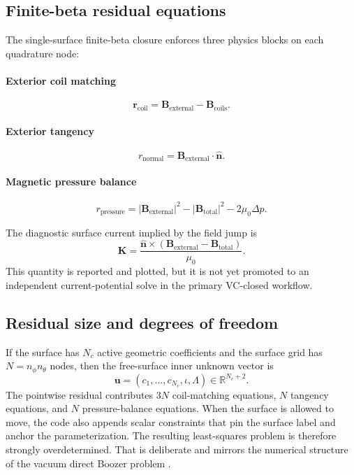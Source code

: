 \documentclass[11pt]{article}
\begin{document}
\subsection{Finite-beta residual equations}
The single-surface finite-beta closure enforces three physics blocks on each quadrature node:

\paragraph{Exterior coil matching}
\begin{equation}
  \mathbf{r}_{\mathrm{coil}} = \mathbf{B}_{\mathrm{external}} - \mathbf{B}_{\mathrm{coils}}.
  \label{eq:rcoil}
\end{equation}

\paragraph{Exterior tangency}
\begin{equation}
  r_{\mathrm{normal}} = \mathbf{B}_{\mathrm{external}} \cdot \hat{\mathbf{n}}.
  \label{eq:rnormal}
\end{equation}

\paragraph{Magnetic pressure balance}
\begin{equation}
  r_{\mathrm{pressure}} = |\mathbf{B}_{\mathrm{external}}|^2 - |\mathbf{B}_{\mathrm{total}}|^2 - 2\mu_0 \Delta p.
  \label{eq:rpressure}
\end{equation}

The diagnostic surface current implied by the field jump is
\begin{equation}
  \mathbf{K} = \frac{\hat{\mathbf{n}} \times \left(\mathbf{B}_{\mathrm{external}} - \mathbf{B}_{\mathrm{total}}\right)}{\mu_0}.
  \label{eq:sheetcurrent}
\end{equation}
This quantity is reported and plotted, but it is not yet promoted to an independent current-potential solve in the primary VC-closed workflow.

\subsection{Residual size and degrees of freedom}
If the surface has $N_c$ active geometric coefficients and the surface grid has $N = n_{\phi} n_{\theta}$ nodes, then the free-surface inner unknown vector is
\begin{equation}
  \mathbf{u} = (c_1,\dots,c_{N_c},\iota,\Lambda) \in \mathbb{R}^{N_c+2}.
\end{equation}
The pointwise residual contributes $3N$ coil-matching equations, $N$ tangency equations, and $N$ pressure-balance equations. When the surface is allowed to move, the code also appends scalar constraints that pin the surface label and anchor the parameterization. The resulting least-squares problem is therefore strongly overdetermined. That is deliberate and mirrors the numerical structure of the vacuum direct Boozer problem \cite{Giuliani2022,Giuliani2023}.
\end{document}
